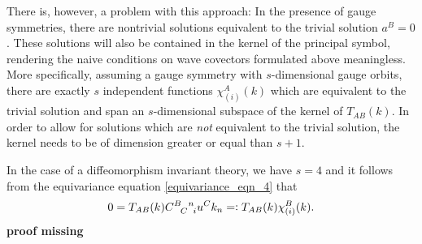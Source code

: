 There is, however, a problem with this approach: In the presence of gauge symmetries, there are nontrivial solutions equivalent to the trivial solution $a^B=0$. These solutions will also be contained in the kernel of the principal symbol, rendering the naive conditions on wave covectors formulated above meaningless. More specifically, assuming a gauge symmetry with $s$-dimensional gauge orbits, there are exactly $s$ independent functions $\chi_{(i)}^A(k)$ which are equivalent to the trivial solution and span an $s$-dimensional subspace of the kernel of $T_{AB}(k)$. In order to allow for solutions which are \emph{not} equivalent to the trivial solution, the kernel needs to be of dimension greater or equal than $s+1$.

In the case of a diffeomorphism invariant theory, we have $s=4$ and it follows from the equivariance equation \eqref{equivariance_eqn_4} that
\begin{equation}
  0 = T_{AB}(k) \gmc{B}{C}{n}{i} u^C k_n =\vcentcolon T_{AB}(k) \chi^B_{(i)}(k).
\end{equation}
\textbf{proof missing}

